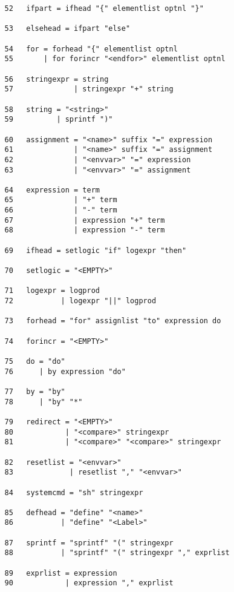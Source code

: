 \documentclass[11pt]{article}
\begin{document}
\begin{verbatim}
   52   ifpart = ifhead "{" elementlist optnl "}" 

   53   elsehead = ifpart "else" 

   54   for = forhead "{" elementlist optnl 
   55       | for forincr "<endfor>" elementlist optnl 

   56   stringexpr = string 
   57              | stringexpr "+" string 

   58   string = "<string>" 
   59          | sprintf ")" 

   60   assignment = "<name>" suffix "=" expression 
   61              | "<name>" suffix "=" assignment 
   62              | "<envvar>" "=" expression 
   63              | "<envvar>" "=" assignment 

   64   expression = term 
   65              | "+" term 
   66              | "-" term 
   67              | expression "+" term 
   68              | expression "-" term 

   69   ifhead = setlogic "if" logexpr "then" 

   70   setlogic = "<EMPTY>" 

   71   logexpr = logprod 
   72           | logexpr "||" logprod 

   73   forhead = "for" assignlist "to" expression do 

   74   forincr = "<EMPTY>" 

   75   do = "do" 
   76      | by expression "do" 

   77   by = "by" 
   78      | "by" "*" 

   79   redirect = "<EMPTY>" 
   80            | "<compare>" stringexpr 
   81            | "<compare>" "<compare>" stringexpr 

   82   resetlist = "<envvar>" 
   83             | resetlist "," "<envvar>" 

   84   systemcmd = "sh" stringexpr 

   85   defhead = "define" "<name>" 
   86           | "define" "<Label>" 

   87   sprintf = "sprintf" "(" stringexpr 
   88           | "sprintf" "(" stringexpr "," exprlist 

   89   exprlist = expression 
   90            | expression "," exprlist 


\end{verbatim}
\end{document}
